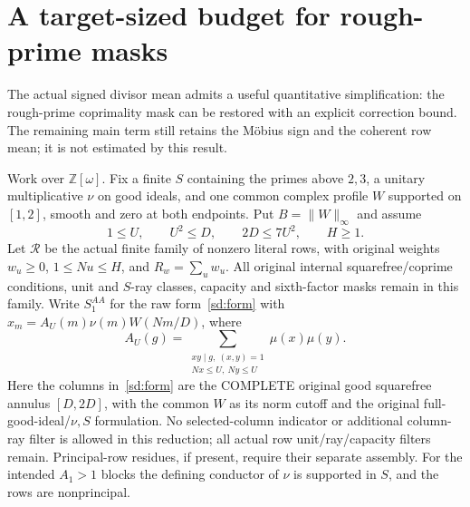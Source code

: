 \section{A target-sized budget for rough-prime masks}\label{rma:core}
The actual signed divisor mean admits a useful quantitative simplification:
the rough-prime coprimality mask can be restored with an explicit correction
bound.
The remaining main term still retains the M\"obius sign and the coherent
row mean; it is not estimated by this result.

Work over $\mathbb Z[\omega]$. Fix a finite $S$ containing the primes above $2,3$,
a unitary multiplicative $\nu$ on good ideals, and one common complex
profile $W$ supported on $[1,2]$, smooth and zero at both endpoints.
Put $B=\|W\|_\infty$ and assume
\begin{equation}\label{rma:window}
 1\le U,\qquad U^2\le D,\qquad 2D\le7U^2,\qquad H\ge1.
\end{equation}
Let $\mathcal R$ be the actual finite family of nonzero literal rows,
with original weights $w_u\ge0$, $1\le Nu\le H$, and $R_w=\sum_u w_u$. All original internal
squarefree/coprime conditions, unit and $S$-ray classes, capacity and
sixth-factor masks remain in this family. Write $S_1^{AA}$ for the raw
form~\eqref{sd:form} with $x_m=A_U(m)\nu(m)W(Nm/D)$, where
\begin{equation}\label{rma:AU}
 A_U(g)=\sum_{\substack{xy\mid g,\ (x,y)=1\\Nx\le U,\ Ny\le U}}
                  \mu(x)\mu(y).
\end{equation}
Here the columns in~\eqref{sd:form} are the COMPLETE original good
squarefree annulus $[D,2D]$, with the common $W$ as its norm cutoff and
the original full-good-ideal/$\nu,S$ formulation. No selected-column
indicator or additional column-ray filter is allowed in this reduction;
all actual row unit/ray/capacity filters remain.
Principal-row residues, if present, require their separate assembly.
For the intended $A_1>1$ blocks the defining conductor of $\nu$ is
supported in $S$, and the rows are nonprincipal.

